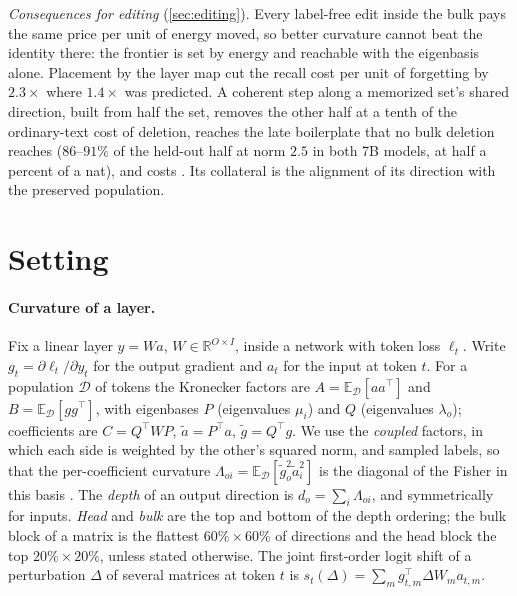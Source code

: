 \documentclass{article}
\theoremstyle{definition}\newtheorem{law}{Empirical law}
\newcommand{\E}{\mathbb{E}}
\newcommand{\R}{\mathbb{R}}
\newcommand{\D}{\mathcal{D}}
\begin{document}
\emph{Consequences for editing} (\cref{sec:editing}). Every label-free edit inside the bulk pays the same price per unit of energy moved, so better curvature cannot beat the identity there: the frontier is set by energy and reachable with the eigenbasis alone. Placement by the layer map cut the recall cost per unit of forgetting by $2.3\times$ where $1.4\times$ was predicted. A coherent step along a memorized set's shared direction, built from half the set, removes the other half at a tenth of the ordinary-text cost of deletion, reaches the late boilerplate that no bulk deletion reaches ($86$--$91\%$ of the held-out half at norm $2.5$ in both 7B models, at half a percent of a nat), and costs \baselineCost. Its collateral is the alignment of its direction with the preserved population.

\section{Setting}\label{sec:setting}

\paragraph{Curvature of a layer.} Fix a linear layer $y=Wa$, $W\in\R^{O\times I}$, inside a network with token loss $\ell_t$. Write $g_t=\partial\ell_t/\partial y_t$ for the output gradient and $a_t$ for the input at token $t$. For a population $\D$ of tokens the Kronecker factors are $A=\E_\D[aa^\top]$ and $B=\E_\D[gg^\top]$, with eigenbases $P$ (eigenvalues $\mu_i$) and $Q$ (eigenvalues $\lambda_o$); coefficients are $C=Q^\top WP$, $\tilde a=P^\top a$, $\tilde g=Q^\top g$. We use the \emph{coupled} factors, in which each side is weighted by the other's squared norm, and sampled labels, so that the per-coefficient curvature $\Lambda_{oi}=\E_\D[\tilde g_o^2\tilde a_i^2]$ is the diagonal of the Fisher in this basis \citep{george2018fast}. The \emph{depth} of an output direction is $d_o=\sum_i\Lambda_{oi}$, and symmetrically for inputs. \emph{Head} and \emph{bulk} are the top and bottom of the depth ordering; the bulk block of a matrix is the flattest $60\%\times60\%$ of directions and the head block the top $20\%\times20\%$, unless stated otherwise. The joint first-order logit shift of a perturbation $\Delta$ of several matrices at token $t$ is $s_t(\Delta)=\sum_m g_{t,m}^\top\Delta W_m a_{t,m}$.
\end{document}
